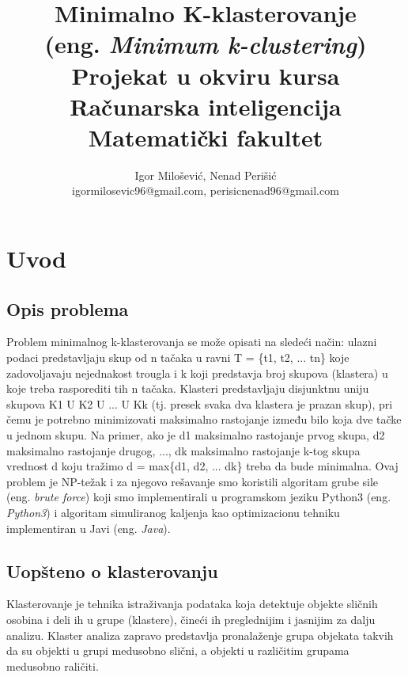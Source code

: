 \documentclass[a4paper]{article}
\begin{document}
\title{Minimalno K-klasterovanje\\ \small(eng. \textit{Minimum k-clustering})\\ \small{Projekat u okviru kursa Računarska inteligencija\\ Matematički fakultet}}

\author{Igor Milošević, Nenad Perišić\\ igormilosevic96@gmail.com, perisicnenad96@gmail.com}


\maketitle

\tableofcontents

\newpage

\section{Uvod}
\subsection{Opis problema}
Problem minimalnog k-klasterovanja se može opisati na sledeći način: ulazni podaci predstavljaju skup od n tačaka u ravni T = \{t1, t2, ... tn\} koje zadovoljavaju nejednakost trougla i k koji predstavja broj skupova (klastera) u koje treba rasporediti tih n tačaka. Klasteri predstavljaju disjunktnu uniju skupova K1 U K2 U ... U Kk (tj. presek svaka dva klastera je prazan skup), pri čemu je potrebno minimizovati maksimalno rastojanje između bilo koja dve tačke u jednom skupu. Na primer, ako je d1 maksimalno rastojanje prvog skupa, d2 maksimalno rastojanje drugog, ..., dk maksimalno rastojanje k-tog skupa vrednost d koju tražimo 
d = max\{d1, d2, ... dk\} treba da bude minimalna. Ovaj problem je NP-težak i za njegovo rešavanje smo koristili algoritam grube sile (eng. \textit{brute force}) koji smo implementirali u programskom jeziku Python3 (eng. \textit{Python3}) i algoritam simuliranog kaljenja kao optimizacionu tehniku implementiran u Javi (eng. \textit{Java}).


\subsection{Uopšteno o klasterovanju}
Klasterovanje je tehnika istraživanja podataka koja detektuje objekte sličnih osobina i deli
ih u grupe (klastere), čineći ih preglednijim i jasnijim za dalju analizu. Klaster analiza zapravo
predstavlja pronalaženje grupa objekata takvih da su objekti u grupi medusobno slični, a objekti
u različitim grupama medusobno raličiti.\cite{aggarwal} \\
\end{document}

